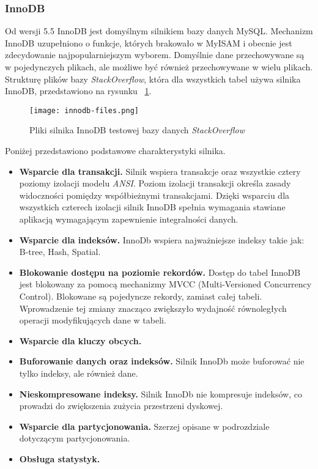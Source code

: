 \subsubsection{InnoDB}
Od wersji 5.5 InnoDB jest domyślnym silnikiem bazy danych MySQL. Mechanizm InnoDB uzupełniono o funkcje, których brakowało w MyISAM i obecnie jest zdecydowanie najpopularniejszym wyborem. Domyślnie dane przechowywane są w pojedynczych plikach, ale możliwe być również przechowywane w wielu plikach. Strukturę plików bazy \textit{StackOverflow}, która dla wszystkich tabel używa silnika InnoDB, przedstawiono na rysunku ~\ref{fig:innodb-fileslabel}.
\begin{figure}[!h]
	\caption{Pliki silnika InnoDB testowej bazy danych \textit{StackOverflow}}
	\centering
	\texttt{[image: innodb-files.png]}
	\label{fig:innodb-fileslabel}
\end{figure}
Poniżej przedstawiono podstawowe charakterystyki silnika.
\begin{itemize}
	\item \textbf{Wsparcie dla transakcji.} Silnik wspiera transakcje oraz wszystkie cztery poziomy izolacji modelu \textit{ANSI}. Poziom izolacji transakcji określa zasady widoczności pomiędzy współbieżnymi transakcjami. Dzięki wsparciu dla wszystkich czterech izolacji  silnik InnoDB spełnia wymagania stawiane aplikacją wymagającym zapewnienie integralności danych. 
	\item \textbf{Wsparcie dla indeksów.} InnoDb wspiera najważniejsze indeksy takie jak: B-tree, Hash, Spatial.
	\item \textbf{Blokowanie dostępu na poziomie rekordów. } Dostęp do tabel InnoDB jest blokowany za pomocą mechanizmy MVCC (Multi-Versioned Concurrency Control). Blokowane są pojedyncze rekordy, zamiast całej tabeli. Wprowadzenie tej zmiany znacząco zwiększyło wydajność równoległych operacji modyfikujących dane w tabeli.
	\item \textbf{Wsparcie dla kluczy obcych.}
	\item \textbf{Buforowanie danych oraz indeksów.} Silnik InnoDb może buforować nie tylko indeksy, ale również dane.
	\item  \textbf{Nieskompresowane indeksy.} Silnik InnoDb nie kompresuje indeksów, co prowadzi do zwiększenia zużycia przestrzeni dyskowej.
	\item \textbf{Wsparcie dla partycjonowania.} Szerzej opisane w podrozdziale dotyczącym partycjonowania.
	\item \textbf{Obsługa statystyk.}
\end{itemize}

